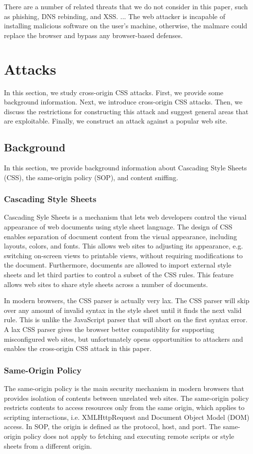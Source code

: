 \documentclass{acm_proc_article-sp}
\begin{document}
There are a number of related threats that we do not consider in this paper, such as phishing, DNS rebinding, and XSS.
...
The web attacker is incapable of installing malicious software on the user's machine, otherwise, the malmare could replace the browser and bypass any browser-based defenses.

\section{Attacks}
In this section, we study cross-origin CSS attacks. First, we provide some background information. Next, we introduce cross-origin CSS attacks. Then, we discuss the restrictions for constructing this attack and suggest general areas that are exploitable. Finally, we construct an attack against a popular web site.

\subsection{Background}
In this section, we provide background information about Cascading Style Sheets (CSS), the same-origin policy (SOP), and content sniffing.

\subsubsection{Cascading Style Sheets}
Cascading Syle Sheets\cite{css} is a mechanism that lets web developers control the visual appearance of web documents using style sheet language. The design of CSS enables separation of document content from the visual appearance, including layouts, colors, and fonts. This allows web sites to adjusting its appearance, e.g. switching on-screen views to printable views, without requiring modifications to the document. Furthermore, documents are allowed to import external style sheets and let third parties to control a subset of the CSS rules. This feature allows web sites to share style sheets across a number of documents.

In modern browsers, the CSS parser is actually very lax. The CSS parser will skip over any amount of invalid syntax in the style sheet until it finds the next valid rule. This is unlike the JavaScript parser that will abort on the first syntax error. A lax CSS parser gives the browser better compatiblity for supporting misconfigured web sites, but unfortunately opens opportunities to attackers and enables the cross-origin CSS attack in this paper.

\subsubsection{Same-Origin Policy}
The same-origin policy\cite{mozillasameorigin} is the main security mechanism in modern browsers that provides isolation of contents between unrelated web sites. The same-origin policy restricts contents to access resources only from the same origin, which applies to scripting interactions, i.e. XMLHttpRequest and Document Object Model (DOM)\cite{dom} access. In SOP, the origin is defined as the protocol, host, and port. The same-origin policy does not apply to fetching and executing remote scripts or style sheets from a different origin.
\end{document}
